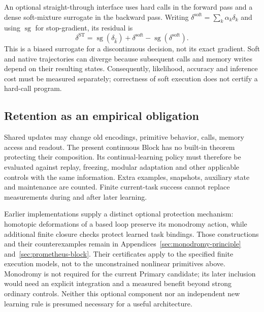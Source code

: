 An optional straight-through interface uses hard calls in the forward pass
and a dense soft-mixture surrogate in the backward pass. Writing
$\delta^{\mathrm{soft}}=\sum_k\alpha_k\delta_k$ and using
$\operatorname{sg}$ for stop-gradient, its residual is
\begin{equation}
 \delta^{\mathrm{ST}}=
 \operatorname{sg}(\delta_{\widehat k})+
 \delta^{\mathrm{soft}}-\operatorname{sg}(\delta^{\mathrm{soft}}).
\end{equation}
This is a biased surrogate for a discontinuous decision, not its exact
gradient. Soft and native trajectories can diverge because subsequent calls
and memory writes depend on their resulting states. Consequently, likelihood,
accuracy and inference cost must be measured separately; correctness of soft
execution does not certify a hard-call program.

\subsection{Retention as an empirical obligation}

Shared updates may change old encodings, primitive behavior, calls, memory
access and readout. The present continuous Block has no built-in theorem
protecting their composition. Its continual-learning policy must therefore
be evaluated against replay, freezing, modular adaptation and other applicable
controls with the same information. Extra examples, snapshots, auxiliary
state and maintenance are counted. Finite current-task success cannot replace
measurements during and after later learning.

Earlier implementations supply a distinct optional protection mechanism:
homotopic deformations of a based loop preserve its monodromy action, while
additional finite closure checks protect learned task bindings. Those
constructions and their counterexamples remain in
Appendices~\ref{sec:monodromy-principle} and~\ref{sec:prometheus-block}.
Their certificates apply to the specified finite execution models, not to the
unconstrained nonlinear primitives above. Monodromy is not required for the
current Primary candidate; its later inclusion would need an explicit
integration and a measured benefit beyond strong ordinary controls. Neither
this optional component nor an independent new learning rule is presumed
necessary for a useful architecture.
